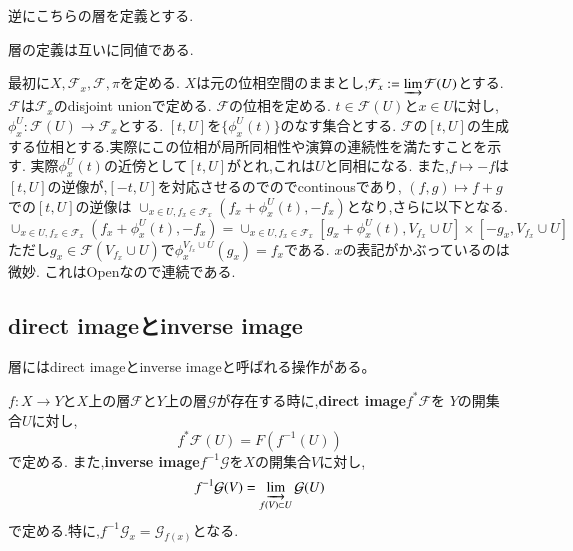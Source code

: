 逆にこちらの層を定義とする.
\begin{prop}
層の定義は互いに同値である.
\end{prop}
最初に$X, \mathcal{F}_x, \mathcal{F}, \pi$を定める.
$X$は元の位相空間のままとし,$\mathcal{F}_x := \varinjlim \mathcal{F}(U)$とする.$\mathcal{F}$は$\mathcal{F}_x$のdisjoint unionで定める.
$\mathcal{F}$の位相を定める.
$t \in \mathcal{F}(U)$と$x \in U$に対し,$\phi_x^U: \mathcal{F}(U) \to \mathcal{F}_x$とする.
$[t, U]$を$\{\phi_x^{U}(t)\}$のなす集合とする.
$\mathcal{F}$の$[t, U]$の生成する位相とする.実際にこの位相が局所同相性や演算の連続性を満たすことを示す.
実際$\phi_x^U(t)$の近傍として$[t,U]$がとれ,これは$U$と同相になる.
また,$f \mapsto -f$は$[t, U]$の逆像が,$[-t, U]$を対応させるのでのでcontinousであり,
$(f, g) \mapsto f + g$での$[t, U]$の逆像は
$\cup_{x \in U, f_x \in \mathcal{F}_x}(f_x+\phi_x^U(t), -f_x)$となり,さらに以下となる.
\begin{equation*}
\cup_{x \in U, f_x \in \mathcal{F}_x}(f_x+\phi_x^U(t), -f_x) = \cup_{x \in U, f_x \in \mathcal{F}_x} [g_x + \phi_x^U(t), V_{f_x} \cup U] \times [-g_x, V_{f_x} \cup U]
\end{equation*}
ただし$g_x \in \mathcal{F}(V_{f_x} \cup U)$で$\phi_x^{V_{f_x} \cup U}(g_x) = f_x$である.
$x$の表記がかぶっているのは微妙.
これはOpenなので連続である.

\subsection{direct imageとinverse image}
層にはdirect imageとinverse imageと呼ばれる操作がある。

\begin{screen}
\begin{dfn}
$f: X \to Y$と$X$上の層$\mathcal{F}$と$Y$上の層$\mathcal{G}$が存在する時に,\textbf{direct image}$f^*\mathcal{F}$を
$Y$の開集合$U$に対し,
\begin{equation*}
f^* \mathcal{F}(U) = F(f^{-1}(U))
\end{equation*}
で定める.
また,\textbf{inverse image}$f^{-1}\mathcal{G}$を$X$の開集合$V$に対し,
\begin{equation*}
f^{-1} \mathcal{G}(V) = \varinjlim_{f(V) \subset U} \mathcal{G}(U)
\end{equation*}
で定める.特に,$f^{-1}\mathcal{G}_x = \mathcal{G}_{f(x)}$となる.
\end{dfn}
\end{screen}

